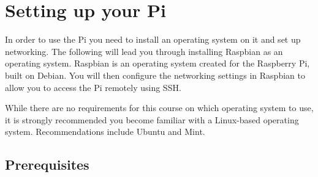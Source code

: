 \section{Setting up your Pi}
\label{sec:Installation}
In order to use the Pi you need to install an operating system on it and set up networking.  The following will lead you through installing Raspbian as an operating system.  Raspbian is an operating system created for the Raspberry Pi, built on Debian.  You will then configure the networking settings in Raspbian to allow you to access the Pi remotely using SSH.

While there are no requirements for this course on which operating system to use, it is strongly recommended you become familiar with a Linux-based operating system. Recommendations include Ubuntu and Mint.

\subsection{Prerequisites}
\label{sec:Prereqs}
\begin{table}[H]
\centering
{}
\end{table}

